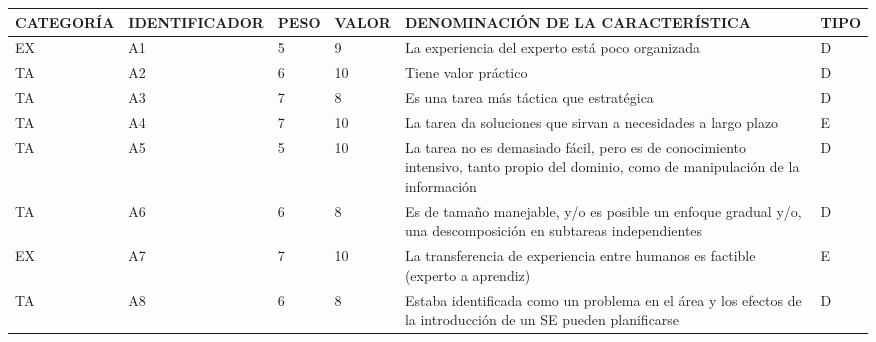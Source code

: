 \documentclass[a4paper,12pt]{article}
\begin{document}
\begin{table}[h]
	\centering
	\begin{tabular}{|l|l|l|l|p{4cm}|l|}
		\hline
		\scriptsize CATEGORÍA & \scriptsize IDENTIFICADOR & \scriptsize PESO & \scriptsize VALOR & \scriptsize DENOMINACIÓN DE LA CARACTERÍSTICA                                                                                       & \scriptsize TIPO \\ \hline
		EX                    & A1                        & 5                & 9                 & La experiencia del experto está poco organizada                                                                                     & D                \\ \hline
		TA                    & A2                        & 6                & 10                & Tiene valor práctico                                                                                                                & D                \\ \hline
		TA                    & A3                        & 7                & 8                 & Es una tarea más táctica que estratégica                                                                                            & D                \\ \hline
		TA                    & A4                        & 7                & 10                & La tarea da soluciones que sirvan a necesidades a largo plazo                                                                       & E                \\ \hline
		TA                    & A5                        & 5                & 10                & La tarea no es demasiado fácil, pero es de conocimiento intensivo, tanto propio del dominio, como de manipulación de la información & D                \\ \hline
		TA                    & A6                        & 6                & 8                 & Es de tamaño manejable, y/o es posible un enfoque gradual y/o, una descomposición en subtareas independientes                       & D                \\ \hline
		EX                    & A7                        & 7                & 10                & La transferencia de experiencia entre humanos es factible (experto a aprendiz)                                                      & E                \\ \hline
		TA                    & A8                        & 6                & 8                 & Estaba identificada como un problema en el área y los efectos de la introducción de un SE pueden planificarse                       & D                \\ \hline

\end{tabular}
\end{table}
\end{document}
